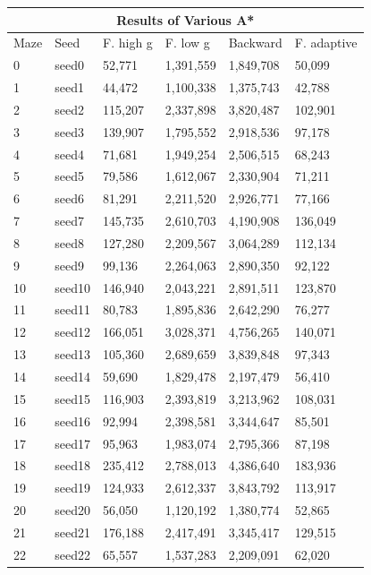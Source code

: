 \documentclass{article}
\begin{document}
\begin{center}
\begin{table}
    \begin{tabular}{ |p{0.75cm}|p{1cm}|p{2cm}|p{2cm}|p{2cm}|p{2cm}| }
    \hline
    \multicolumn{6}{|c|}{Results of Various A*} \\
    \hline
    Maze & Seed &F. high g& F. low g&Backward&F. adaptive\\
    \hline
    0 & seed0 & 52,771 & 1,391,559 & 1,849,708 & 50,099\\
    1 & seed1 & 44,472 & 1,100,338 & 1,375,743 & 42,788\\
    2 & seed2 & 115,207 & 2,337,898 & 3,820,487 & 102,901\\
    3 & seed3 & 139,907 & 1,795,552 & 2,918,536 & 97,178\\
    4 & seed4 & 71,681 & 1,949,254 & 2,506,515 & 68,243\\
    5 & seed5 & 79,586 & 1,612,067 & 2,330,904 & 71,211\\
    6 & seed6 & 81,291 & 2,211,520 & 2,926,771 & 77,166\\
    7 & seed7 & 145,735 & 2,610,703 & 4,190,908 & 136,049\\
    8 & seed8 & 127,280 & 2,209,567 & 3,064,289 & 112,134\\
    9 & seed9 & 99,136 & 2,264,063 & 2,890,350 & 92,122\\
    10 & seed10 & 146,940 & 2,043,221 & 2,891,511 & 123,870\\
    11 & seed11 & 80,783 & 1,895,836 & 2,642,290 & 76,277\\
    12 & seed12 & 166,051 & 3,028,371 & 4,756,265 & 140,071\\
    13 & seed13 & 105,360 & 2,689,659 & 3,839,848 & 97,343\\
    14 & seed14 & 59,690 & 1,829,478 & 2,197,479 & 56,410\\
    15 & seed15 & 116,903 & 2,393,819 & 3,213,962 & 108,031\\
    16 & seed16 & 92,994 & 2,398,581 & 3,344,647 & 85,501\\
    17 & seed17 & 95,963 & 1,983,074 & 2,795,366 & 87,198\\
    18 & seed18 & 235,412 & 2,788,013 & 4,386,640 & 183,936\\
    19 & seed19 & 124,933 & 2,612,337 & 3,843,792 & 113,917\\
    20 & seed20 & 56,050 & 1,120,192 & 1,380,774 & 52,865\\
    21 & seed21 & 176,188 & 2,417,491 & 3,345,417 & 129,515\\
    22 & seed22 & 65,557 & 1,537,283 & 2,209,091 & 62,020\\

\end{tabular}
\end{table}
\end{center}
\end{document}
